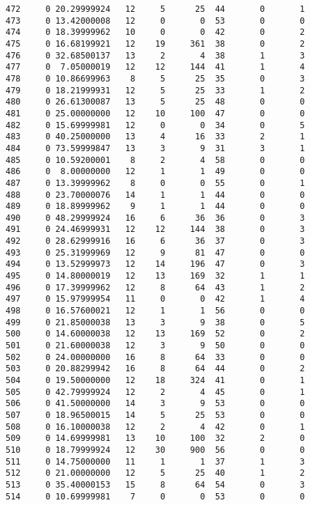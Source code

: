 \documentclass[
  letterpaper,
  DIV=11,
  numbers=noendperiod]{scrreprt}
\begin{document}
\begin{verbatim}
472     0 20.29999924   12     5      25  44       0       1
473     0 13.42000008   12     0       0  53       0       0
474     0 18.39999962   10     0       0  42       0       2
475     0 16.68199921   12    19     361  38       0       2
476     0 32.68500137   13     2       4  38       1       3
477     0  7.05000019   12    12     144  41       1       4
478     0 10.86699963    8     5      25  35       0       3
479     0 18.21999931   12     5      25  33       1       2
480     0 26.61300087   13     5      25  48       0       0
481     0 25.00000000   12    10     100  47       0       0
482     0 15.69999981   12     0       0  34       0       5
483     0 40.25000000   13     4      16  33       2       1
484     0 73.59999847   13     3       9  31       3       1
485     0 10.59200001    8     2       4  58       0       0
486     0  8.00000000   12     1       1  49       0       0
487     0 13.39999962    8     0       0  55       0       1
488     0 23.70000076   14     1       1  44       0       0
489     0 18.89999962    9     1       1  44       0       0
490     0 48.29999924   16     6      36  36       0       3
491     0 24.46999931   12    12     144  38       0       3
492     0 28.62999916   16     6      36  37       0       3
493     0 25.31999969   12     9      81  47       0       0
494     0 13.52999973   12    14     196  47       0       3
495     0 14.80000019   12    13     169  32       1       1
496     0 17.39999962   12     8      64  43       1       2
497     0 15.97999954   11     0       0  42       1       4
498     0 16.57600021   12     1       1  56       0       0
499     0 21.85000038   13     3       9  38       0       5
500     0 14.60000038   12    13     169  52       0       2
501     0 21.60000038   12     3       9  50       0       0
502     0 24.00000000   16     8      64  33       0       0
503     0 20.88299942   16     8      64  44       0       2
504     0 19.50000000   12    18     324  41       0       1
505     0 42.79999924   12     2       4  45       0       1
506     0 41.50000000   14     3       9  53       0       0
507     0 18.96500015   14     5      25  53       0       0
508     0 16.10000038   12     2       4  42       0       1
509     0 14.69999981   13    10     100  32       2       0
510     0 18.79999924   12    30     900  56       0       0
511     0 14.75000000   11     1       1  37       1       3
512     0 21.00000000   12     5      25  40       1       2
513     0 35.40000153   15     8      64  54       0       3
514     0 10.69999981    7     0       0  53       0       0

\end{verbatim}
\end{document}

